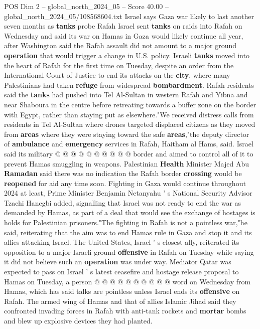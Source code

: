 \begin{textsample}{POS Dim 2 – global\_north\_2024\_05 – Score 40.00 – global\_north\_2024\_05/108568604.txt}  \label{ex:f2_pos_291}
Israel says Gaza war likely to last another seven months as \textbf{tanks} probe Rafah Israel sent \textbf{tanks} on raids into Rafah on Wednesday and said its war on Hamas in Gaza would likely continue all year, after Washington said the Rafah assault did not amount to a major ground \textbf{operation} that would trigger a change in U.S. policy.
Israeli \textbf{tanks} moved into the heart of Rafah for the first time on Tuesday, despite an order from the International Court of Justice to end its attacks on the \textbf{city}, where many Palestinians had taken \textbf{refuge} from widespread \textbf{bombardment}.
Rafah residents said the \textbf{tanks} had pushed into Tel Al-Sultan in western Rafah and Yibna and near Shaboura in the centre before retreating towards a buffer zone on the border with Egypt, rather than staying put as elsewhere."We received distress calls from residents in Tel Al-Sultan where drones targeted displaced citizens as they moved from \textbf{areas} where they were staying toward the safe \textbf{areas},"the deputy director of \textbf{ambulance} and \textbf{emergency} services in Rafah, Haitham al Hams, said.
Israel said its military @ @ @ @ @ @ @ @ @ @ border and aimed to control all of it to prevent Hamas smuggling in weapons.
Palestinian \textbf{Health} Minister Majed Abu \textbf{Ramadan} said there was no indication the Rafah border \textbf{crossing} would be \textbf{reopened} for aid any time soon.
Fighting in Gaza would continue throughout 2024 at least, Prime Minister Benjamin Netanyahu ' s National Security Advisor Tzachi Hanegbi added, signalling that Israel was not ready to end the war as demanded by Hamas, as part of a deal that would see the exchange of hostages is holds for Palestinian prisoners."The fighting in Rafah is not a pointless war,"he said, reiterating that the aim was to end Hamas rule in Gaza and stop it and its allies attacking Israel.
The United States, Israel ' s closest ally, reiterated its opposition to a major Israeli ground \textbf{offensive} in Rafah on Tuesday while saying it did not believe such an \textbf{operation} was under way.
Mediator Qatar was expected to pass on Israel ' s latest ceasefire and hostage release proposal to Hamas on Tuesday, a person @ @ @ @ @ @ @ @ @ @ word on Wednesday from Hamas, which has said talks are pointless unless Israel ends its \textbf{offensive} on Rafah.
The armed wing of Hamas and that of allies Islamic Jihad said they confronted invading forces in Rafah with anti-tank rockets and \textbf{mortar} bombs and blew up explosive devices they had planted.

\end{textsample}
